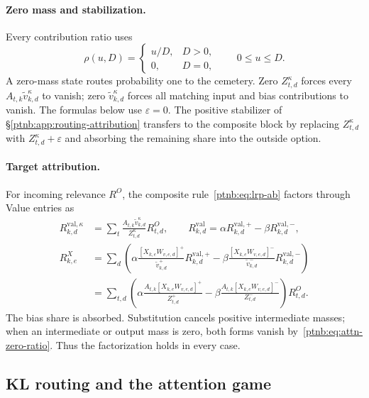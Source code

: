 \paragraph{Zero mass and stabilization.}
Every contribution ratio uses
\begin{equation}\label{ptnb:eq:attn-zero-ratio}
    \rho(u,D)=\begin{cases}u/D,&D>0,\\0,&D=0,\end{cases}
    \qquad 0\le u\le D.
\end{equation}
A zero-mass state routes probability one to the cemetery. Zero $Z_{t,d}^\kappa$ forces every $A_{t,k}\tilde v_{k,d}^\kappa$ to vanish; zero $\tilde v_{k,d}^\kappa$ forces all matching input and bias contributions to vanish. The formulas below use $\varepsilon=0$. The positive stabilizer of \S\ref{ptnb:app:routing-attribution} transfers to the composite block by replacing $Z_{t,d}^\kappa$ with $Z_{t,d}^\kappa+\varepsilon$ and absorbing the remaining share into the outside option.

\paragraph{Target attribution.}
For incoming relevance $R^O$, the composite rule~\eqref{ptnb:eq:lrp-ab} factors through Value entries as
\begin{align}
    R^{\mathrm{val},\kappa}_{k,d}
      &=\sum_t\frac{A_{t,k}\tilde v_{k,d}^\kappa}{Z_{t,d}^\kappa}R^O_{t,d},
    \qquad R^{\mathrm{val}}_{k,d}
      =\alpha R^{\mathrm{val},+}_{k,d}-\beta R^{\mathrm{val},-}_{k,d},
      \label{ptnb:eq:attn-target-rule}\\
    R^X_{k,e}&=\sum_d\left(
       \alpha\frac{[X_{k,e}W_{v,e,d}]^+}{\tilde v_{k,d}^+}R^{\mathrm{val},+}_{k,d}
       -\beta\frac{[X_{k,e}W_{v,e,d}]^-}{\tilde v_{k,d}^-}R^{\mathrm{val},-}_{k,d}
       \right)\label{ptnb:eq:attn-target-input-via-V}\\
      &=\sum_{t,d}\left(
       \alpha\frac{A_{t,k}[X_{k,e}W_{v,e,d}]^+}{Z_{t,d}^+}
       -\beta\frac{A_{t,k}[X_{k,e}W_{v,e,d}]^-}{Z_{t,d}^-}
       \right)R^O_{t,d}.\label{ptnb:eq:attn-target-input}
\end{align}
The bias share is absorbed. Substitution cancels positive intermediate masses; when an intermediate or output mass is zero, both forms vanish by~\eqref{ptnb:eq:attn-zero-ratio}. Thus the factorization holds in every case.

\subsection{KL routing and the attention game}\label{ptnb:app:kl-legendre-fenchel}

